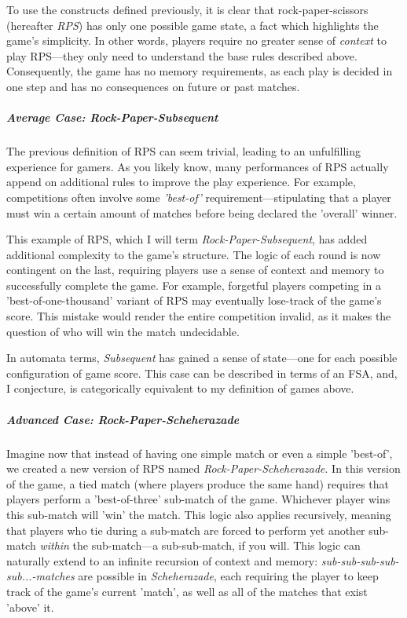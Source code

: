 \documentclass{report}
\begin{document}
To use the constructs defined previously, it is clear that rock-paper-scissors (hereafter \emph{RPS}) has only one possible game state, a fact which highlights the game's simplicity. In other words, players require no greater sense of \emph{context} to play RPS---they only need to understand the base rules described above. Consequently, the game has no memory requirements, as each play is decided in one step and has no consequences on future or past matches.

\subparagraph{Average Case: \emph{Rock-Paper-Subsequent}}
The previous definition of RPS can seem trivial, leading to an unfulfilling experience for gamers. As you likely know, many performances of RPS actually append on additional rules to improve the play experience. For example, competitions often involve some \emph{'best-of'} requirement---stipulating that a player must win a certain amount of matches before being declared the 'overall' winner. 

This example of RPS, which I will term \emph{Rock-Paper-Subsequent}, has added additional complexity to the game's structure. The logic of each round is now contingent on the last, requiring players use a sense of context and memory to successfully complete the game. For example, forgetful players competing in a 'best-of-one-thousand' variant of RPS may eventually lose-track of the game's score. This mistake would render the entire competition invalid, as it makes the question of who will win the match undecidable. 

In automata terms, \emph{Subsequent} has gained a sense of state---one for each possible configuration of game score. This case can be described in terms of an FSA, and, I conjecture, is categorically equivalent to my definition of games above.

\subparagraph{Advanced Case: \emph{Rock-Paper-Scheherazade}}
Imagine now that instead of having one simple match or even a simple 'best-of', we created a new version of RPS named \emph{Rock-Paper-Scheherazade}. In this version of the game, a tied match (where players produce the same hand) requires that players perform a 'best-of-three' sub-match of the game. Whichever player wins this sub-match will 'win' the match. This logic also applies recursively, meaning that players who tie during a sub-match are forced to perform yet another sub-match \emph{within} the sub-match---a sub-sub-match, if you will. This logic can naturally extend to an infinite recursion of context and memory: \emph{sub-sub-sub-sub-sub...-matches} are possible in \emph{Scheherazade}, each requiring the player to keep track of the game's current 'match', as well as all of the matches that exist 'above' it.
\end{document}
